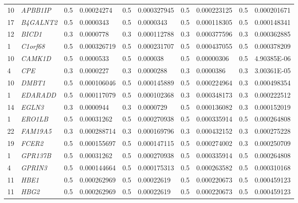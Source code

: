 \begin{refsection}
\begin{otherlanguage}{english}
\begin{scriptsize}
\begin{longtable}{llllllllll}
10 & \cellcolor[HTML]{009901}\textit{APBB1IP} & 0.5 & 0.00024274 & 0.5 & 0.000327945 & 0.5 & 0.000223125 & 0.5 & 0.000201671 \\
17 & \cellcolor[HTML]{009901}\textit{B4GALNT2} & 0.5 & 0.0000343 & 0.5 & 0.0000343 & 0.5 & 0.000118305 & 0.5 & 0.000148341 \\
12 & \cellcolor[HTML]{009901}\textit{BICD1} & 0.3 & 0.0000778 & 0.3 & 0.000112788 & 0.3 & 0.000377596 & 0.3 & 0.000362885 \\
1 & \cellcolor[HTML]{009901}\textit{C1orf68} & 0.5 & 0.000326719 & 0.5 & 0.000231707 & 0.5 & 0.000437055 & 0.5 & 0.000378209 \\
10 & \cellcolor[HTML]{009901}\textit{CAMK1D} & 0.5 & 0.0000533 & 0.5 & 0.000038 & 0.5 & 0.00000306 & 0.5 & 4.90385E-06 \\
4 & \cellcolor[HTML]{009901}\textit{CPE} & 0.3 & 0.0000227 & 0.3 & 0.0000288 & 0.3 & 0.0000386 & 0.3 & 3.00361E-05 \\
10 & \cellcolor[HTML]{009901}\textit{DMBT1} & 0.5 & 0.000106046 & 0.5 & 0.000145889 & 0.5 & 0.000224964 & 0.3 & 0.000498354 \\
1 & \cellcolor[HTML]{009901}\textit{EDARADD} & 0.5 & 0.000117079 & 0.5 & 0.000102368 & 0.3 & 0.000348173 & 0.3 & 0.000222512 \\
14 & \cellcolor[HTML]{009901}\textit{EGLN3} & 0.3 & 0.0000944 & 0.3 & 0.0000729 & 0.5 & 0.000136082 & 0.3 & 0.000152019 \\
1 & \cellcolor[HTML]{009901}\textit{ERO1LB} & 0.5 & 0.00031262 & 0.5 & 0.000270938 & 0.5 & 0.000335914 & 0.5 & 0.000264808 \\
22 & \cellcolor[HTML]{009901}\textit{FAM19A5} & 0.3 & 0.000288714 & 0.3 & 0.000169796 & 0.3 & 0.000432152 & 0.3 & 0.000275228 \\
19 & \cellcolor[HTML]{009901}\textit{FCER2} & 0.5 & 0.000155697 & 0.5 & 0.000147115 & 0.5 & 0.000274002 & 0.3 & 0.000250709 \\
1 & \cellcolor[HTML]{009901}\textit{GPR137B} & 0.5 & 0.00031262 & 0.5 & 0.000270938 & 0.5 & 0.000335914 & 0.5 & 0.000264808 \\
4 & \cellcolor[HTML]{009901}\textit{GPRIN3} & 0.5 & 0.000144664 & 0.5 & 0.000175313 & 0.5 & 0.000263582 & 0.5 & 0.000310168 \\
11 & \cellcolor[HTML]{009901}\textit{HBE1} & 0.5 & 0.000262969 & 0.5 & 0.00022619 & 0.5 & 0.000220673 & 0.5 & 0.000459123 \\
11 & \cellcolor[HTML]{009901}\textit{HBG2} & 0.5 & 0.000262969 & 0.5 & 0.00022619 & 0.5 & 0.000220673 & 0.5 & 0.000459123 \\

\end{longtable}
\end{scriptsize}
\end{otherlanguage}
\end{refsection}
